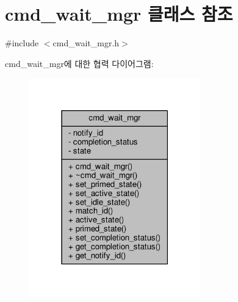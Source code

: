 \hypertarget{classavdecc__lib_1_1cmd__wait__mgr}{}\section{cmd\+\_\+wait\+\_\+mgr 클래스 참조}
\label{classavdecc__lib_1_1cmd__wait__mgr}


{\ttfamily \#include $<$cmd\+\_\+wait\+\_\+mgr.\+h$>$}



cmd\+\_\+wait\+\_\+mgr에 대한 협력 다이어그램\+:
\nopagebreak
\begin{figure}[H]
\begin{center}
\leavevmode
\includegraphics[width=210pt]{classavdecc__lib_1_1cmd__wait__mgr__coll__graph}
\end{center}
\end{figure}
